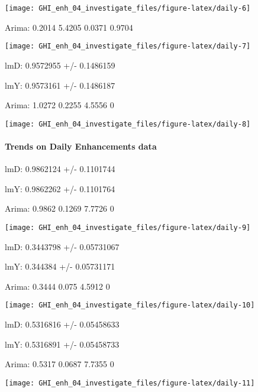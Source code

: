\documentclass[
  10pt,
  a4paper,oneside]{article}
\begin{document}
\begin{center}\texttt{[image: GHI\_enh\_04\_investigate\_files/figure-latex/daily-6]} \end{center}

Arima: 0.2014 5.4205 0.0371 0.9704

\begin{center}\texttt{[image: GHI\_enh\_04\_investigate\_files/figure-latex/daily-7]} \end{center}

lmD: 0.9572955 +/- 0.1486159

lmY: 0.9573161 +/- 0.1486187

Arima: 1.0272 0.2255 4.5556 0

\begin{center}\texttt{[image: GHI\_enh\_04\_investigate\_files/figure-latex/daily-8]} \end{center}

\newpage

\hypertarget{trends-on-daily-enhancements-data}{%
\paragraph{Trends on Daily Enhancements data}\label{trends-on-daily-enhancements-data}}

lmD: 0.9862124 +/- 0.1101744

lmY: 0.9862262 +/- 0.1101764

Arima: 0.9862 0.1269 7.7726 0

\begin{center}\texttt{[image: GHI\_enh\_04\_investigate\_files/figure-latex/daily-9]} \end{center}

lmD: 0.3443798 +/- 0.05731067

lmY: 0.344384 +/- 0.05731171

Arima: 0.3444 0.075 4.5912 0

\begin{center}\texttt{[image: GHI\_enh\_04\_investigate\_files/figure-latex/daily-10]} \end{center}

lmD: 0.5316816 +/- 0.05458633

lmY: 0.5316891 +/- 0.05458733

Arima: 0.5317 0.0687 7.7355 0

\begin{center}\texttt{[image: GHI\_enh\_04\_investigate\_files/figure-latex/daily-11]} \end{center}
\end{document}
